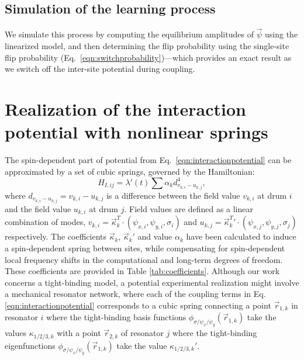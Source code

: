 \subsection{Simulation of the learning process}
We simulate this process by computing the equilibrium amplitudes of $\vec{\psi}$ using the linearized model, and then determining the flip probability using the single-site flip probability (Eq.~\ref{eqn:switchprobability})---which provides an exact result as we switch off the inter-site potential during coupling.

\section{Realization of the interaction potential with nonlinear springs}\label{Appendix:NonlinearSprings}
The spin-dependent part of potential from Eq.~\ref{eqn:interactionpotential} can be approximated by a set of cubic springs, governed by the Hamiltonian:
\begin{equation}
H_{I,ij}=\lambda'(t)\sum{\alpha_kd^4_{v_{k,i}-u_{k,j}}},
\label{eqn:interactionpotentialSpring}
\end{equation}
where $d_{v_{k,i}-u_{k,j}}=v_{k,i}-u_{k,j}$ is a difference  between the field value $v_{k,i}$ at drum $i$ and the field value $u_{k,i}$ at drum $j$. Field values are defined as a linear combination of modes, $v_{k,i}=\vec{\kappa}^T_k \cdot (\psi_{x, i}, \psi_{y, i}, \sigma_{i})$ and $u_{k,j}=\vec{\kappa}^T_k{}' \cdot (\psi_{x, j}, \psi_{y, j}, \sigma_{j})$ respectively.  The coefficients $\vec{\kappa}_k$, $\vec{\kappa}_k{}'$ and value $\alpha_k$ have been calculated to induce a spin-dependent spring between sites, while compensating for spin-dependent local frequency shifts in the computational and long-term degrees of freedom. These coefficients are provided in Table \ref{tab:coefficients}. Although our work concerns a tight-binding model, a potential experimental realization might involve a mechanical resonator network, where each of the coupling terms in Eq. \ref{eqn:interactionpotential} corresponds to a cubic spring connecting a point $\vec{r}_{1,k}$ in resonator $i$ where the tight-binding basis functions $\phi_{\sigma/\psi_x/\psi_y}(\vec{r}_{1,k})$ take the values $\kappa_{1/2/3,k}$ with a point $\vec{r}_{2,k}$ of resonator $j$ where the tight-binding eigenfunctions $\phi_{\sigma/\psi_x/\psi_y}(\vec{r}_{1,k})$ take the value $\kappa_{1/2/3,k}'$. 

